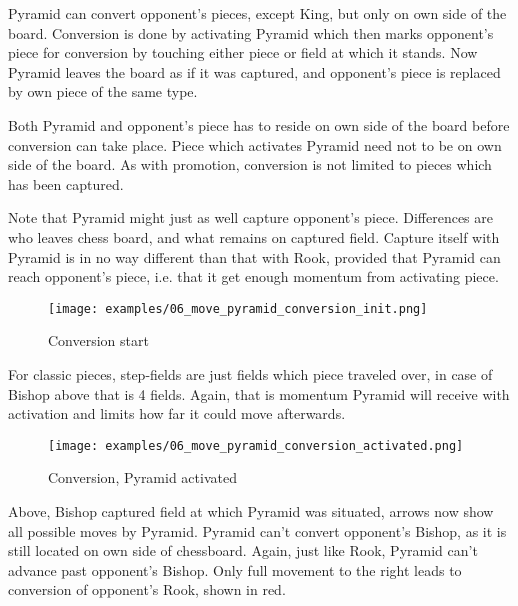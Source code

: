 Pyramid can convert opponent's pieces, except King, but only on own side of
the board. Conversion is done by activating Pyramid which then marks opponent's
piece for conversion by touching either piece or field at which it stands. Now
Pyramid leaves the board as if it was captured, and opponent's piece is replaced
by own piece of the same type.

Both Pyramid and opponent's piece has to reside on own side of the board
before conversion can take place. Piece which activates Pyramid need not
to be on own side of the board. As with promotion, conversion is not limited
to pieces which has been captured.

Note that Pyramid might just as well capture opponent's piece. Differences are
who leaves chess board, and what remains on captured field. Capture itself with
Pyramid is in no way different than that with Rook, provided that Pyramid can
reach opponent's piece, i.e. that it get enough momentum from activating piece.

\clearpage %

\noindent
\begin{figure}[!h]
\texttt{[image: examples/06\_move\_pyramid\_conversion\_init.png]}
\caption{Conversion start}
\label{fig:06_move_pyramid_conversion_init}
\end{figure}

For classic pieces, step-fields are just fields which piece traveled over,
in case of Bishop above that is 4 fields. Again, that is momentum Pyramid
will receive with activation and limits how far it could move afterwards.

\clearpage %

\noindent
\begin{figure}[!h]
\texttt{[image: examples/06\_move\_pyramid\_conversion\_activated.png]}
\caption{Conversion, Pyramid activated}
\label{fig:06_move_pyramid_conversion_activated}
\end{figure}

Above, Bishop captured field at which Pyramid was situated, arrows now show
all possible moves by Pyramid. Pyramid can't convert opponent's Bishop, as it
is still located on own side of chessboard. Again, just like Rook, Pyramid
can't advance past opponent's Bishop. Only full movement to the right leads
to conversion of opponent's Rook, shown in red.

